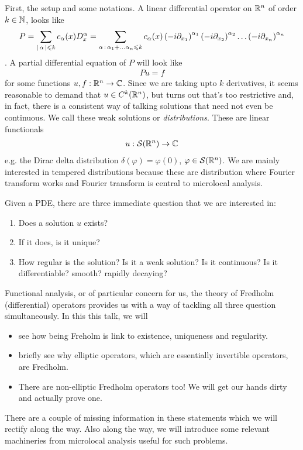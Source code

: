 \documentclass{article}
\begin{document}
First, the setup and some notations. A linear differential operator on ${\mathbb R}^n$ of order $k \in {\ensuremath {\mathbb N}}$, looks like 
\begin{align*}
P = \sum_{\left|\, \alpha\,\right| \leqslant k} c_\alpha(x) D^\alpha_x = \sum_{\alpha \, : \, \alpha_1 + \dots \alpha_n \leqslant k} c_\alpha(x) \left(-i \partial_{x_1}\right)^{\alpha_1}\left(-i \partial_{x_2}\right)^{\alpha_2} \dots \left(-i \partial_{x_n}\right)^{\alpha_n}
\end{align*}
. A partial differential equation of $P$ will look like
\begin{align*}
P u = f
\end{align*}
for some functions $u, f : {\mathbb R}^n \to {\ensuremath {\mathbb C}}$. Since we are taking upto $k$ derivatives, it seems reasonable to demand that $u \in C^k({\mathbb R}^n)$, but turns out that's too restrictive and, in fact, there is a consistent way of talking solutions that need not even be continuous. We call these weak solutions or \emph{distributions}. These are linear functionals 
\begin{align*}
u : \mathcal{S}({\mathbb R}^n) \to {\ensuremath {\mathbb C}}
\end{align*}
e.g. the Dirac delta distribution $\delta(\varphi) = \varphi(0)$, $\varphi \in \mathcal{S}({\mathbb R}^n)$. We are mainly interested in tempered distributions because these are distribution where Fourier transform works and Fourier transform is central to microlocal analysis. 

Given a PDE, there are three immediate question that we are interested in: 
\begin{enumerate}
    \item Does a solution $u$ exists? 
    \item If it does, is it unique? 
    \item How regular is the solution? Is it a weak solution? Is it continuous? Is it differentiable? smooth? rapidly decaying? 
\end{enumerate}

Functional analysis, or of particular concern for us, the theory of Fredholm (differential) operators provides us with a way of tackling all three question simultaneously. In this this talk, we will 

\begin{itemize}
    \item see how being Freholm is link to existence, uniqueness and regularity. 
    \item briefly see why elliptic operators, which are essentially invertible operators, are Fredholm. 
    \item There are non-elliptic Fredholm operators too! We will get our hands dirty and actually prove one. 
\end{itemize}
There are a couple of missing information in these statements which we will rectify along the way. Also along the way, we will introduce some relevant machineries from microlocal analysis  useful for such problems. 
\end{document}
